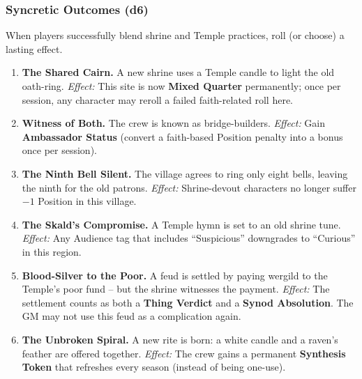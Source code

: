 \subsubsection*{Syncretic Outcomes (d6)}
When players successfully blend shrine and Temple practices, roll (or choose) a lasting effect.
\begin{enumerate}[label=\arabic*., wide=0pt]
    \item \textbf{The Shared Cairn.} A new shrine uses a Temple candle to light the old oath-ring. \textit{Effect:} This site is now \textbf{Mixed Quarter} permanently; once per session, any character may reroll a failed faith-related roll here.
    \item \textbf{Witness of Both.} The crew is known as bridge-builders. \textit{Effect:} Gain \textbf{Ambassador Status} (convert a faith-based Position penalty into a bonus once per session).
    \item \textbf{The Ninth Bell Silent.} The village agrees to ring only eight bells, leaving the ninth for the old patrons. \textit{Effect:} Shrine-devout characters no longer suffer $-1$ Position in this village.
    \item \textbf{The Skald's Compromise.} A Temple hymn is set to an old shrine tune. \textit{Effect:} Any Audience tag that includes ``Suspicious'' downgrades to ``Curious'' in this region.
    \item \textbf{Blood-Silver to the Poor.} A feud is settled by paying wergild to the Temple's poor fund -- but the shrine witnesses the payment. \textit{Effect:} The settlement counts as both a \textbf{Thing Verdict} and a \textbf{Synod Absolution}. The GM may not use this feud as a complication again.
    \item \textbf{The Unbroken Spiral.} A new rite is born: a white candle and a raven's feather are offered together. \textit{Effect:} The crew gains a permanent \textbf{Synthesis Token} that refreshes every season (instead of being one-use).
\end{enumerate}

